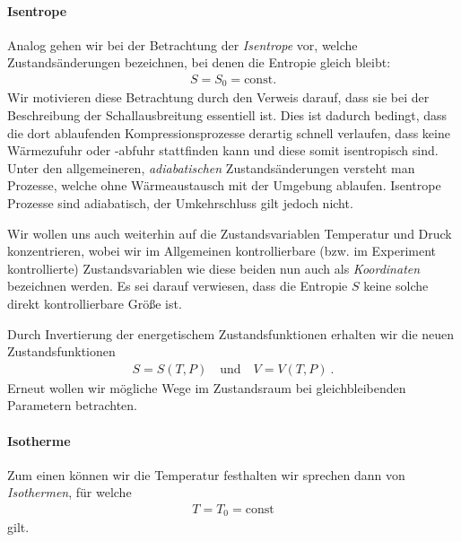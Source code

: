 \paragraph*{Isentrope}
Analog gehen wir bei der Betrachtung der \emph{Isentrope} vor, welche Zustandsänderungen bezeichnen, bei denen die Entropie gleich bleibt:
\begin{align*}
    S=S_0=\mathrm{const}.%
\end{align*}
Wir motivieren diese Betrachtung durch den Verweis darauf, dass sie bei der Beschreibung der Schallausbreitung essentiell ist. Dies ist dadurch bedingt, dass die dort ablaufenden Kompressionsprozesse derartig schnell verlaufen, dass keine Wärmezufuhr oder -abfuhr stattfinden kann und diese somit isentropisch sind. Unter den allgemeineren, \emph{adiabatischen} Zustandsänderungen versteht man Prozesse, welche ohne Wärmeaustausch mit der Umgebung ablaufen. Isentrope Prozesse sind adiabatisch, der Umkehrschluss gilt jedoch nicht. 


Wir wollen uns auch weiterhin auf die Zustandsvariablen Temperatur und Druck konzentrieren, wobei wir im Allgemeinen kontrollierbare (bzw. im Experiment kontrollierte) Zustandsvariablen wie diese beiden nun auch als \emph{Koordinaten} bezeichnen werden. Es sei darauf verwiesen, dass die Entropie $S$ keine solche direkt kontrollierbare Größe ist.

Durch Invertierung der energetischem Zustandsfunktionen erhalten wir die neuen Zustandsfunktionen
\begin{align*}
    \boxed{S=S(T,P) \quad\mathrm{und}\quad V=V(T,P)}\:.
\end{align*}
Erneut wollen wir mögliche Wege im Zustandsraum bei gleichbleibenden Parametern betrachten.


\paragraph*{Isotherme}
Zum einen können wir die Temperatur festhalten \textendash{} wir sprechen dann von \emph{Isothermen}, für welche
\begin{align*}
    T=T_0=\mathrm{const}%
\end{align*}
gilt.



